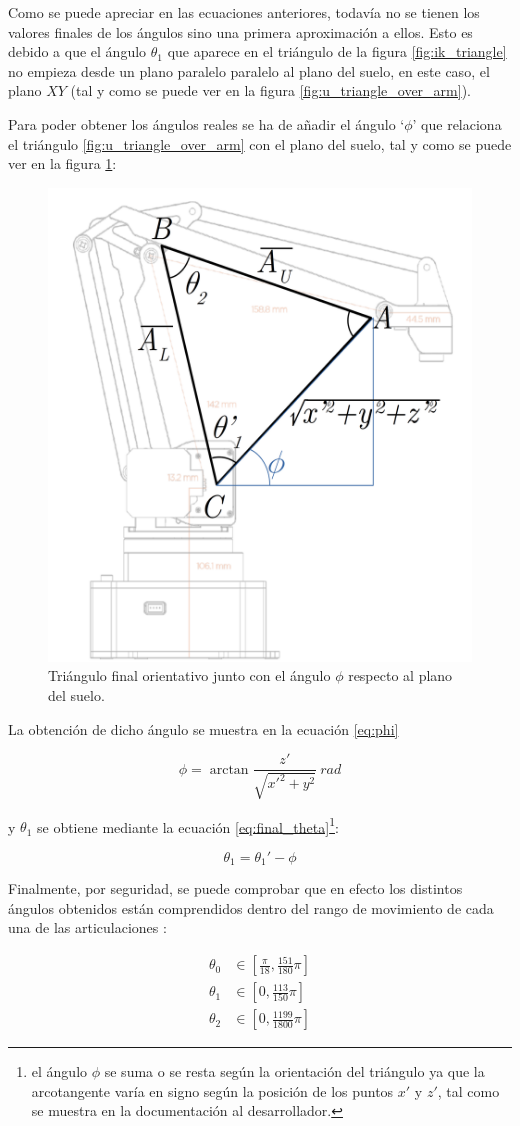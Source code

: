 Como se puede apreciar en las ecuaciones anteriores, todavía no se tienen los valores finales
de los ángulos sino una primera aproximación a ellos. Esto es debido a que el ángulo
$\theta_1$ que aparece en el triángulo de la figura \ref{fig:ik_triangle}
no empieza desde un plano paralelo paralelo al plano del suelo, en este caso, el plano $XY$ (tal y como se puede ver
en la figura \ref{fig:u_triangle_over_arm}).

Para poder obtener los ángulos reales se ha de añadir el ángulo `$\phi$' que relaciona el triángulo
\ref{fig:u_triangle_over_arm} con el plano del suelo, tal y como se puede ver en la figura
\ref{fig:final_triangle}:

\begin{figure}[H]
    \centering
    \includegraphics[width=.5\linewidth]{pictures/ik_final.png}
    \caption{Triángulo final orientativo junto con el ángulo $\phi$ respecto al plano del suelo.}
    \label{fig:final_triangle}
\end{figure}

La obtención de dicho ángulo se muestra en la ecuación \ref{eq:phi}

\begin{equation}\label{eq:phi}
    \phi = \arctan{\frac{z'}{\sqrt{x'^2 + y^2}}}~rad
\end{equation}

y $\theta_1$ se obtiene mediante la ecuación
\ref{eq:final_theta}\footnote{el ángulo $\phi$ se suma o se resta según la orientación
    del triángulo ya que la arcotangente varía en signo según la posición de los puntos
    $x'$ y $z'$, tal como se muestra en la documentación al desarrollador\cite{UArmDeveloperSwiftProForArduino}.}:

\begin{equation}\label{eq:final_theta}
    \theta_1 = \theta_1' - \phi
\end{equation}

Finalmente, por seguridad, se puede comprobar que en efecto los distintos ángulos obtenidos
están comprendidos dentro del rango de movimiento de cada una de las articulaciones
\cite{UArmDeveloperSwiftProForArduino}:

\begin{align*}
    \theta_0 & \in \left[\frac{\pi}{18}, \frac{151}{180}\pi\right] \\
    \theta_1 & \in \left[0, \frac{113}{150}\pi\right]              \\
    \theta_2 & \in \left[0, \frac{1199}{1800}\pi\right]
\end{align*}